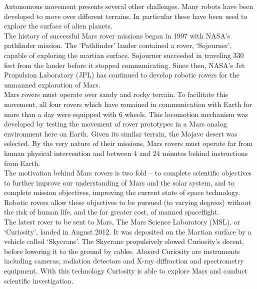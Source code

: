     Autonomous movement presents several other challenges. Many robots have been developed to move over different terrains. In particular these have been used to explore the surface of alien planets.\\
    The history of successful Mars rover missions began in 1997 with NASA's pathfinder mission. The `Pathfinder' lander contained a rover, `Sojourner', capable of exploring the martian surface. Sojourner succeeded in traveling 330 feet from the lander before it stopped communicating.\cite{MSUsojourner} Since then, NASA's Jet Propulsion Laboratory (JPL) has continued to develop robotic rovers for the unmanned exploration of Mars.\\
    Mars rovers must operate over sandy and rocky terrain. To facilitate this movement, all four rovers which have remained in communication with Earth for more than a day were equipped with 6 wheels. This locomotion mechanism was developed by testing the movement of rover prototypes in a Mars analog environment here on Earth. Given its similar terrain, the Mojave desert was selected. By the very nature of their missions, Mars rovers must operate far from human physical intervention and between 4 and 24 minutes behind instructions from Earth.\cite{Ormston}\\
    The motivation behind Mars rovers is two fold -- to complete scientific objectives to further improve our understanding of Mars and the solar system, and to complete mission objectives, improving the current state of space technology. Robotic rovers allow these objectives to be pursued (to varying degrees) without the risk of human life, and the far greater cost, of manned spaceflight.\\
    The latest rover to be sent to Mars, The Mars Science Laboratory (MSL), or `Curiosity', landed in August 2012.\cite{NASAcuriosity} It was deposited on the Martian surface by a vehicle called `Skycrane'. The Skycrane propulsively slowed Curiosity's decent, before lowering it to the ground by cables. Aboard Curiosity are instruments including cameras, radiation detectors and X-ray diffraction and spectrometry equipment. With this technology Curiosity is able to explore Mars and conduct scientific investigation.

